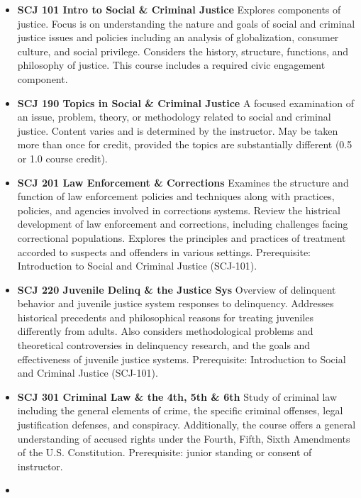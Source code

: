 \documentclass[
  letterpaper,
]{scrbook}
\providecommand{\tightlist}{%
  \setlength{\itemsep}{0pt}\setlength{\parskip}{0pt}}
\begin{document}
\begin{itemize}
\tightlist
\item
  \textbf{SCJ 101 Intro to Social \& Criminal Justice} Explores
  components of justice. Focus is on understanding the nature and goals
  of social and criminal justice issues and policies including an
  analysis of globalization, consumer culture, and social privilege.
  Considers the history, structure, functions, and philosophy of
  justice. This course includes a required civic engagement component.\\
\item
  \textbf{SCJ 190 Topics in Social \& Criminal Justice} A focused
  examination of an issue, problem, theory, or methodology related to
  social and criminal justice. Content varies and is determined by the
  instructor. May be taken more than once for credit, provided the
  topics are substantially different (0.5 or 1.0 course credit).
\item
  \textbf{SCJ 201 Law Enforcement \& Corrections} Examines the structure
  and function of law enforcement policies and techniques along with
  practices, policies, and agencies involved in corrections systems.
  Review the histrical development of law enforcement and corrections,
  including challenges facing correctional populations. Explores the
  principles and practices of treatment accorded to suspects and
  offenders in various settings. Prerequisite: Introduction to Social
  and Criminal Justice (SCJ-101).\\
\item
  \textbf{SCJ 220 Juvenile Delinq \& the Justice Sys} Overview of
  delinquent behavior and juvenile justice system responses to
  delinquency. Addresses historical precedents and philosophical reasons
  for treating juveniles differently from adults. Also considers
  methodological problems and theoretical controversies in delinquency
  research, and the goals and effectiveness of juvenile justice systems.
  Prerequisite: Introduction to Social and Criminal Justice (SCJ-101).
\item
  \textbf{SCJ 301 Criminal Law \& the 4th, 5th \& 6th} Study of criminal
  law including the general elements of crime, the specific criminal
  offenses, legal justification defenses, and conspiracy. Additionally,
  the course offers a general understanding of accused rights under the
  Fourth, Fifth, Sixth Amendments of the U.S. Constitution.
  Prerequisite: junior standing or consent of instructor.\\
\item

\end{itemize}
\end{document}
